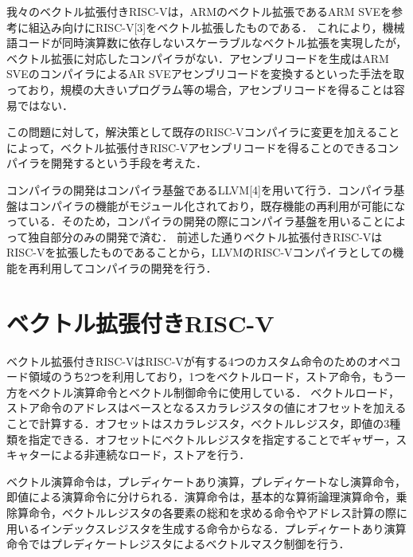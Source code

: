 \documentclass[a4paper,9pt, twocolumn]{jarticle}
\begin{document}
我々のベクトル拡張付きRISC-Vは，ARMのベクトル拡張であるARM SVE\cite{bib:arm_sve}を参考に組込み向けにRISC-V[3]をベクトル拡張したものである．
これにより，機械語コードが同時演算数に依存しないスケーラブルなベクトル拡張を実現したが，ベクトル拡張に対応したコンパイラがない．アセンブリコードを生成はARM SVEのコンパイラによるAR SVEアセンブリコードを変換するといった手法を取っており，規模の大きいプログラム等の場合，アセンブリコードを得ることは容易ではない．

この問題に対して，解決策として既存のRISC-Vコンパイラに変更を加えることによって，ベクトル拡張付きRISC-Vアセンブリコードを得ることのできるコンパイラを開発するという手段を考えた．

コンパイラの開発はコンパイラ基盤であるLLVM[4]を用いて行う．コンパイラ基盤はコンパイラの機能がモジュール化されており，既存機能の再利用が可能になっている．そのため，コンパイラの開発の際にコンパイラ基盤を用いることによって独自部分のみの開発で済む．
前述した通りベクトル拡張付きRISC-VはRISC-Vを拡張したものであることから，LLVMのRISC-Vコンパイラとしての機能を再利用してコンパイラの開発を行う．

\section{ベクトル拡張付きRISC-V}

ベクトル拡張付きRISC-VはRISC-Vが有する4つのカスタム命令のためのオペコード領域のうち2つを利用しており，1つをベクトルロード，ストア命令，もう一方をベクトル演算命令とベクトル制御命令に使用している．
ベクトルロード，ストア命令のアドレスはベースとなるスカラレジスタの値にオフセットを加えることで計算する．オフセットはスカラレジスタ，ベクトルレジスタ，即値の3種類を指定できる．オフセットにベクトルレジスタを指定することでギャザー，スキャターによる非連続なロード，ストアを行う．

ベクトル演算命令は，プレディケートあり演算，プレディケートなし演算命令，即値による演算命令に分けられる．演算命令は，基本的な算術論理演算命令，乗除算命令，ベクトルレジスタの各要素の総和を求める命令やアドレス計算の際に用いるインデックスレジスタを生成する命令からなる．プレディケートあり演算命令ではプレディケートレジスタによるベクトルマスク制御を行う．
\end{document}

